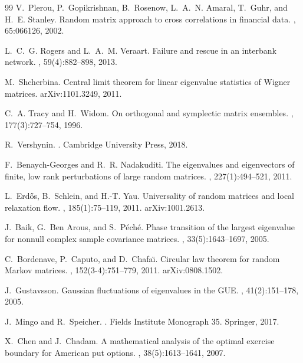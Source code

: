 \documentclass[11pt,a4paper]{article}
\theoremstyle{definition}
\begin{document}
\begin{thebibliography}{99}
V.~Plerou, P.~Gopikrishnan, B.~Rosenow, L.~A.~N. Amaral, T.~Guhr, and H.~E.
  Stanley.
\newblock Random matrix approach to cross correlations in financial data.
, 65:066126, 2002.

L.~C.~G. Rogers and L.~A.~M. Veraart.
\newblock Failure and rescue in an interbank network.
, 59(4):882--898, 2013.

M.~Shcherbina.
\newblock Central limit theorem for linear eigenvalue statistics of Wigner
  matrices.
\newblock arXiv:1101.3249, 2011.

C.~A. Tracy and H.~Widom.
\newblock On orthogonal and symplectic matrix ensembles.
, 177(3):727--754, 1996.

R.~Vershynin.
.
\newblock Cambridge University Press, 2018.

F.~Benaych-Georges and R.~R. Nadakuditi.
\newblock The eigenvalues and eigenvectors of finite, low rank perturbations
of large random matrices.
, 227(1):494--521, 2011.

L.~Erd\H{o}s, B.~Schlein, and H.-T. Yau.
\newblock Universality of random matrices and local relaxation flow.
, 185(1):75--119, 2011. arXiv:1001.2613.

J.~Baik, G.~Ben Arous, and S.~P\'ech\'e.
\newblock Phase transition of the largest eigenvalue for nonnull complex
sample covariance matrices.
, 33(5):1643--1697, 2005.

C.~Bordenave, P.~Caputo, and D.~Chafa\"\i.
\newblock Circular law theorem for random Markov matrices.
, 152(3-4):751--779, 2011.
\newblock arXiv:0808.1502.

J.~Gustavsson.
\newblock Gaussian fluctuations of eigenvalues in the GUE.
, 41(2):151--178, 2005.

J.~Mingo and R.~Speicher.
.
\newblock Fields Institute Monograph 35. Springer, 2017.

X.~Chen and J.~Chadam.
\newblock A mathematical analysis of the optimal exercise boundary for
American put options.
, 38(5):1613--1641, 2007.

\end{thebibliography}
\end{document}
